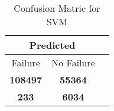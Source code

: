 \begin{table}[] 
\caption{Confusion Matric for SVM} 
\label{Table: Prediction Accuracy-NoneSVMSVMEKF-ignoreReflection100.9EKF-top2-Reflection} 
\centering 
\begin{tabular} 
 {@{}ccc@{}} 
\toprule 
\multicolumn{2}{c}{\textbf{Predicted}}
 \\ \midrule 
\multicolumn{1}{|c|}{Failure} & 
\multicolumn{1}{c|}{No Failure}
 \\ \midrule 
\multicolumn{1}{|c|}{\color{green}\textbf{108497}} & 
\multicolumn{1}{c|}{\color{green}\textbf{55364}}
 \\ \midrule 
\multicolumn{1}{|c|}{\color{red}\textbf{233}} & 
\multicolumn{1}{c|}{\color{red}\textbf{6034}}
 \\ \bottomrule 
\end{tabular} 
\end{table} 
